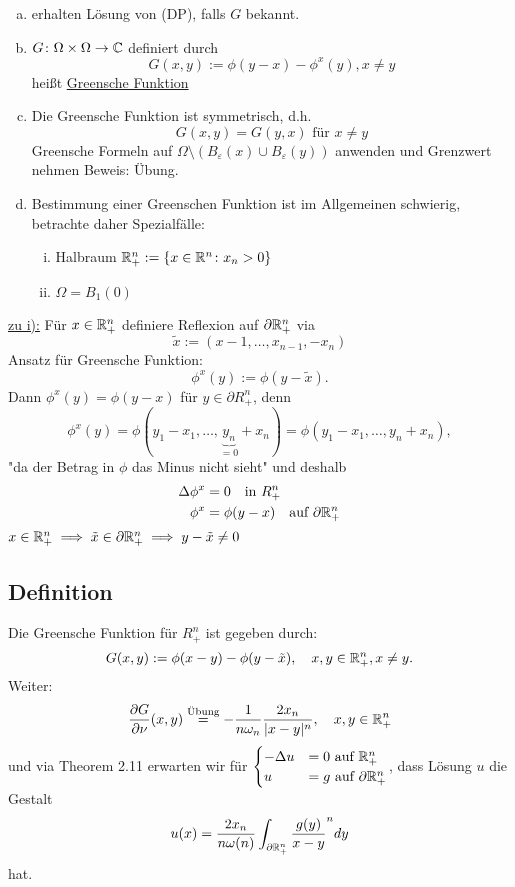 \begin{enumerate}[a)]
  \item erhalten Lösung von (DP), falls $G$ bekannt.
  \item $G \colon \Omega \times \Omega \to \mathbb{C}$ definiert durch 
	$$G(x,y) := \phi(y - x) - \phi^x(y), x \neq y$$
	heißt \underline{Greensche Funktion}
  \item Die Greensche Funktion ist symmetrisch, d.h.
	$$
	G(x,y) = G(y,x) \text{ für } x \neq y
	$$
	{\tiny{Greensche Formeln auf $\Omega \setminus (B_\varepsilon(x) \cup B_\varepsilon(y))$ anwenden und Grenzwert nehmen}}
	Beweis: Übung.
  \item Bestimmung einer Greenschen Funktion ist im Allgemeinen schwierig, betrachte daher Spezialfälle:
    \begin{enumerate}[i)]
      \item Halbraum $\mathbb{R}^n_+ := \{x \in \mathbb{R}^n \colon x_n > 0\}$
      \item $\Omega = B_1(0)$
    \end{enumerate}
\end{enumerate}

\underline{zu i):} Für $x \in \mathbb{R}_+^n$ definiere Reflexion auf $\partial \mathbb{R}_+^n$ via 
$$
\tilde x := (x-1, \dots, x_{n - 1}, -x_n)
$$
Ansatz für Greensche Funktion:
$$
\phi^x(y) := \phi(y - \tilde x).
$$
Dann $\phi^x(y) = \phi(y - x)$ für $y \in \partial R_+^n$, denn
$$
\phi^x(y) = \phi(y_1 - x_1, \dots, \underbrace{y_n}_{=0} + x_n) = \phi(y_1 - x_1, \dots, y_n + x_n),
$$
"da der Betrag in $\phi$ das Minus nicht sieht"
und deshalb
\begin{align*}
	\Delta \phi^x &= 0 \quad\text{in } R_+^n \\
	\phi^x &= \phi(y - x) \quad\text{auf } \partial\mathbb{R}_+^n
\end{align*}
{\tiny{$x \in \mathbb{R}_+^n \implies \tilde x \in \partial \mathbb{R}_+^n \implies y - \tilde x \neq 0$}}

\subsection{Definition}

Die Greensche Funktion für $R_+^n$ ist gegeben durch:
$$
  G(x,y) := \phi(x - y) - \phi(y - \tilde x), \quad x, y \in \mathbb{R}_+^n, x \neq y.
$$
Weiter:
$$
  \frac{\partial G}{\partial \nu}(x,y) \overset{\text{Übung}} = - \frac{1}{n \omega_n} \frac{2 x_n}{|x - y|^n}, \quad x, y \in \mathbb{R}_+^n
$$
und via Theorem 2.11 erwarten wir für $\begin{cases} -\Delta u &= 0 \text{ auf } \mathbb{R}_+^n \\ u&= g \text{ auf } \partial \mathbb{R}_+^n \end{cases}$, dass Lösung $u$ die Gestalt
$$
  u(x) = \frac{2 x_n}{n \omega(n)} \int_{\partial \mathbb{R}_+^n} \frac{g(y)}{x - y}^n dy
$$
hat.


